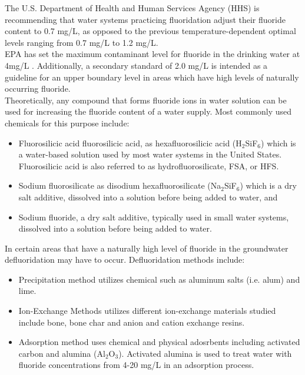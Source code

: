 The U.S. Department of Health and Human Services Agency (HHS) is recommending that water systems practicing fluoridation adjust their fluoride content to 0.7 mg/L, as opposed to the previous temperature-dependent optimal levels ranging from 0.7 mg/L to 1.2 mg/L.\\

EPA has set the maximum contaminant level for fluoride in the drinking water at 4mg/L . Additionally, a secondary standard of 2.0 mg/L  is intended as a guideline for an upper boundary level in areas which have high levels of naturally occurring fluoride.\\

Theoretically, any compound that forms fluoride ions in water solution can be used for increasing the fluoride content of a water supply. Most commonly used chemicals for this purpose include:\\
\begin{itemize}
\item Fluorosilicic acid fluorosilicic acid, as hexafluorosilicic acid (H$_2$SiF$_6$) which is a water-based solution used by most water systems in the United States. Fluorosilicic acid is also referred to as hydrofluorosilicate, FSA, or HFS.
\item Sodium fluorosilicate as disodium hexafluorosilicate (Na$_2$SiF$_6$) which is a dry salt additive, dissolved into a solution before being added to water, and
\item Sodium fluoride, a dry salt additive, typically used in small water systems, dissolved into a solution before being added to water.
\end{itemize}



In certain areas that have a naturally high level of fluoride in the groundwater defluoridation may have to occur.  Defluoridation methods include:
\begin{itemize}
\item Precipitation method utilizes chemical such as aluminum salts (i.e. alum) and lime.
\item  Ion-Exchange Methods utilizes different ion-exchange materials studied include bone, bone char and anion and cation exchange resins.
\item  Adsorption method uses chemical and physical adosrbents including activated carbon and alumina (Al$_2$O$_3$).  Activated alumina is used to treat water with fluoride concentrations from 4-20 mg/L in an adsorption process.
\end{itemize}


